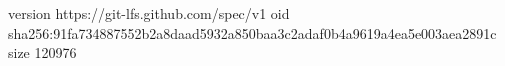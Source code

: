 version https://git-lfs.github.com/spec/v1
oid sha256:91fa734887552b2a8daad5932a850baa3c2adaf0b4a9619a4ea5e003aea2891c
size 120976

